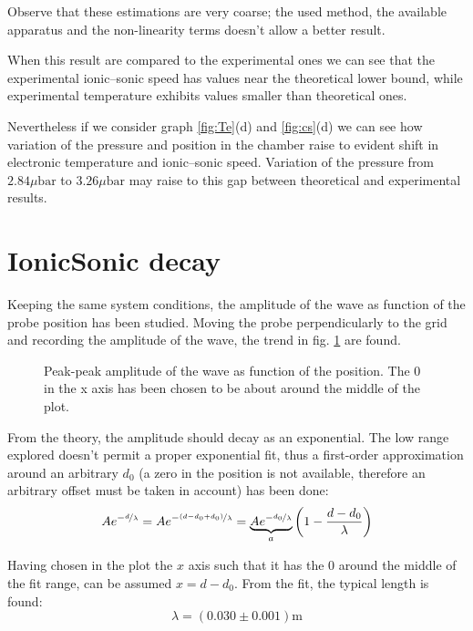 \documentclass[11pt,a4 paper]{article}
\let\oldfrac\frac
\renewcommand{\frac}[3][d]{\ifthenelse{\equal{#1}{d}}{\oldfrac{#2}{#3}}{\nicefrac{#2}{#3}}}
\begin{document}
Observe that these estimations are very coarse; the used method, the available apparatus and the non-linearity terms doesn't allow a better result.


When this result are compared to the experimental ones we can see that the experimental ionic--sonic speed has values near the theoretical lower bound, while experimental temperature  exhibits values smaller than theoretical ones.

Nevertheless if we consider graph \ref{fig:Te}(d) and \ref{fig:cs}(d) we can see how variation of the pressure and position in the chamber raise to evident shift in electronic temperature and ionic--sonic speed. Variation of the pressure from $2.84\si{\mu\bar}$ to $3.26\si{\mu\bar}$ may raise to this gap between theoretical and experimental results.

\section{IonicSonic decay}
Keeping the same system conditions, the amplitude of the wave as function of the probe position has been studied. Moving the probe perpendicularly to the grid and recording the amplitude of the wave, the trend in fig. \ref{fig:ionicsonic:expdecay} are found.

\begin{figure}[H]
  \centering
  \caption{Peak-peak amplitude of the wave as function of the position. The $0$ in the x axis has been chosen to be about around the middle of the plot.}
  \label{fig:ionicsonic:expdecay}
\end{figure}

From the theory, the amplitude should decay as an exponential. The low range explored doesn't permit a proper exponential fit, thus a first-order approximation around an arbitrary $d_0$ (a zero in the position is not available, therefore an arbitrary offset must be taken in account) has been done:
\begin{equation*}
  Ae^{-\frac[f]{d}{\lambda}} = Ae^{-\frac[f]{(d-d_0+d_0)}{\lambda}} =  \underbrace{Ae^{-\frac[f]{d_0}{\lambda}}}_{a} \left( 1 - \frac{d-d_0}{\lambda}\right)
\end{equation*}

Having chosen in the plot the $x$ axis such that it has the $0$ around the middle of the fit range, can be assumed $x = d-d_0$. From the fit, the typical length is found:
\begin{equation*}
  \lambda = ( 0.030 \pm 0.001 )\si{\metre}
\end{equation*}
\end{document}
